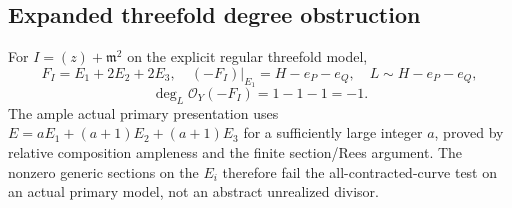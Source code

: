 \subsection*{Expanded threefold degree obstruction}
For $I=(z)+\mathfrak m^2$ on the explicit regular threefold model,
\[
F_I=E_1+2E_2+2E_3,\quad
(-F_I)|_{E_1}=H-e_P-e_Q,\quad L\sim H-e_P-e_Q,
\]
\[
\deg_L\mathcal O_Y(-F_I)=1-1-1=-1.
\]
The ample actual primary presentation uses
$E=aE_1+(a+1)E_2+(a+1)E_3$ for a sufficiently large integer $a$,
proved by relative composition ampleness and the finite section/Rees
argument. The nonzero generic sections on the $E_i$ therefore fail the
all-contracted-curve test on an actual primary model, not an abstract
unrealized divisor.

